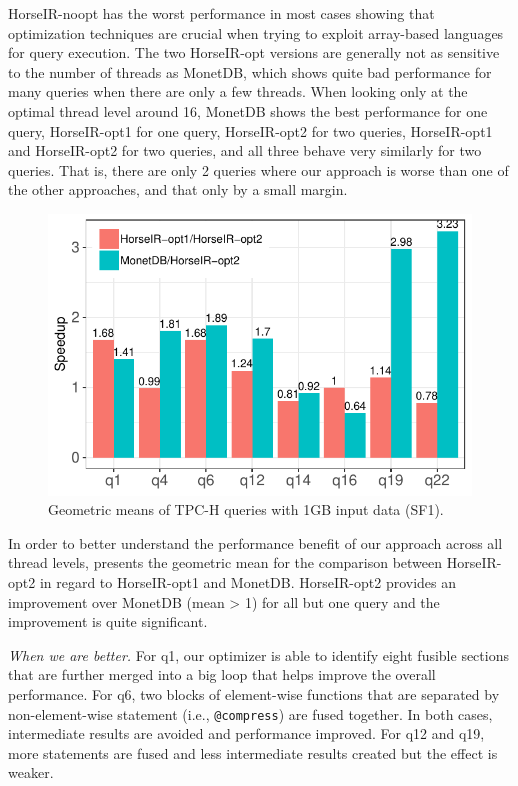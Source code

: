 HorseIR-noopt has the worst performance in most cases showing that optimization
techniques are crucial when trying to exploit array-based languages for query
execution. The two HorseIR-opt versions are generally not as sensitive to the
number of threads as MonetDB, which shows quite bad performance for many
queries when there are only a few threads. 
When looking only at the optimal thread level around 16, MonetDB shows the best
performance for one query, HorseIR-opt1 for one query, HorseIR-opt2 for two
queries, HorseIR-opt1 and HorseIR-opt2 for two queries, and all three behave
very similarly for two queries. That is, there are only 2 queries where our
approach is worse than one of the other approaches, and that only by a small
margin.

\begin{figure}[htbp]
\centering
\includegraphics[width=.9\columnwidth]{./src/figure/sf1-speedup.pdf}
\caption{Geometric means of TPC-H queries with 1GB input data (SF1).}
\label{fig:tpch_sf1_speedup}
\end{figure}

In order to better understand the performance benefit of our approach across all thread levels, 
 presents the geometric mean for the comparison
between HorseIR-opt2 in regard to HorseIR-opt1 and MonetDB.
HorseIR-opt2 provides an improvement over MonetDB (mean > 1) for all but one
query and the improvement is quite significant. 

\textit{When we are better.}
For q1, our optimizer is able to identify eight fusible sections that are
further merged into a big loop that helps improve the overall performance.
For q6, two blocks of element-wise functions that are separated by
non-element-wise statement (i.e., \texttt{@compress}) are fused together. In
both cases, intermediate results are avoided and performance improved.
For q12 and q19, more statements are fused and less intermediate results
created but the effect is weaker.

